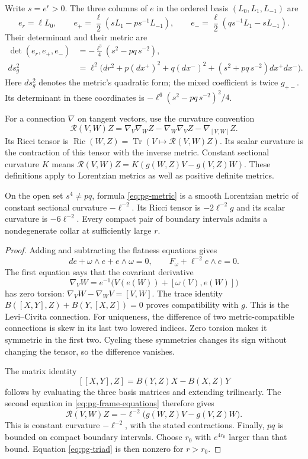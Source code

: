 Write $s=e^r>0$.
The three columns of $e$ in the ordered basis $(L_0,L_1,L_{-1})$ are
\[
 e_r=\ell L_0,\qquad
 e_+=\frac\ell2(sL_1-ps^{-1}L_{-1}),\qquad
 e_-=\frac\ell2(qs^{-1}L_1-sL_{-1}).
\]
Their determinant and their metric are
\begin{align}
 \det(e_r,e_+,e_-)&=-\frac{\ell^3}{4}(s^2-pq\,s^{-2}),
       \label{eq:pg-triad}\\
 ds_g^2&=\ell^2\bigl(dr^2+p(dx^+)^2+q(dx^-)^2
                  +(s^2+pq\,s^{-2})dx^+dx^-\bigr).
       \label{eq:pg-metric}
\end{align}
Here $ds_g^2$ denotes the metric's quadratic form; the mixed coefficient is twice $g_{+-}$.
Its determinant in these coordinates is
$-\ell^6(s^2-pq\,s^{-2})^2/4$.

For a connection $\nabla$ on tangent vectors, use the curvature convention
\[
 \mathcal R(V,W)Z=\nabla_V\nabla_WZ-\nabla_W\nabla_VZ-\nabla_{[V,W]}Z.
\]
Its Ricci tensor is $\operatorname{Ric}(W,Z)=\operatorname{Tr}(V\mapsto\mathcal R(V,W)Z)$.
Its scalar curvature is the contraction of this tensor with the inverse metric.
Constant sectional curvature $K$ means
$\mathcal R(V,W)Z=K(g(W,Z)V-g(V,Z)W)$.
These definitions apply to Lorentzian metrics as well as positive definite metrics.

\begin{theorem}\label{thm:pg-local-einstein}
On the open set $s^4\ne pq$, formula \eqref{eq:pg-metric} is a smooth Lorentzian metric of constant sectional curvature $-\ell^{-2}$.
Its Ricci tensor is $-2\ell^{-2}g$ and its scalar curvature is $-6\ell^{-2}$.
Every compact pair of boundary intervals admits a nondegenerate collar at sufficiently large $r$.
\end{theorem}
\begin{proof}
Adding and subtracting the flatness equations gives
\begin{equation}\label{eq:pg-frame-equations}
 de+\omega\wedge e+e\wedge\omega=0,
 \qquad F_\omega+\ell^{-2}e\wedge e=0.
\end{equation}
The first equation says that the covariant derivative
\[
 \nabla_VW=e^{-1}\bigl(V(e(W))+[\omega(V),e(W)]\bigr)
\]
has zero torsion: $\nabla_VW-\nabla_WV=[V,W]$.
The trace identity $B([X,Y],Z)+B(Y,[X,Z])=0$ proves compatibility with $g$.
This is the Levi--Civita connection.
For uniqueness, the difference of two metric-compatible connections is skew in its last two lowered indices.
Zero torsion makes it symmetric in the first two.
Cycling these symmetries changes its sign without changing the tensor, so the difference vanishes.

The matrix identity
\[
 [[X,Y],Z]=B(Y,Z)X-B(X,Z)Y
\]
follows by evaluating the three basis matrices and extending trilinearly.
The second equation in \eqref{eq:pg-frame-equations} therefore gives
\[
 \mathcal R(V,W)Z=-\ell^{-2}\bigl(g(W,Z)V-g(V,Z)W\bigr).
\]
This is constant curvature $-\ell^{-2}$, with the stated contractions.
Finally, $pq$ is bounded on compact boundary intervals.
Choose $r_0$ with $e^{4r_0}$ larger than that bound.
Equation \eqref{eq:pg-triad} is then nonzero for $r>r_0$.
\end{proof}

